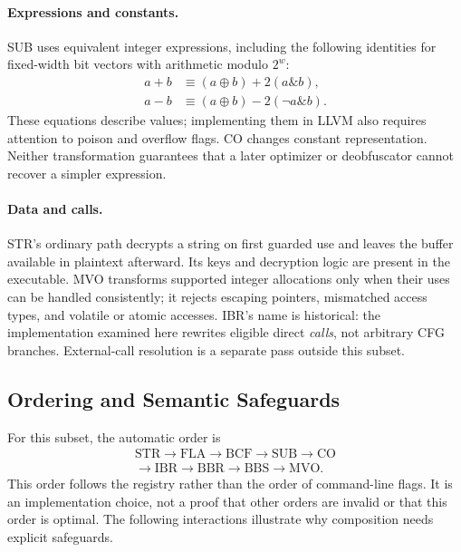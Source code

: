\documentclass[conference]{IEEEtran}
\begin{document}
\paragraph{Expressions and constants.}
SUB uses equivalent integer expressions, including the following
identities for fixed-width bit vectors with arithmetic modulo $2^w$:
\begin{align}
 a+b &\equiv (a\oplus b)+2(a\mathbin{\&}b),\\
 a-b &\equiv (a\oplus b)-2(\neg a\mathbin{\&}b).
\end{align}
These equations describe values; implementing them in LLVM also
requires attention to poison and overflow flags. CO changes constant
representation. Neither transformation guarantees that a later
optimizer or deobfuscator cannot recover a simpler expression.

\paragraph{Data and calls.}
STR's ordinary path decrypts a string on first guarded use and leaves
the buffer available in plaintext afterward. Its keys and decryption
logic are present in the executable. MVO transforms supported integer
allocations only when their uses can be handled consistently; it
rejects escaping pointers, mismatched access types, and volatile or
atomic accesses. IBR's name is historical: the implementation examined
here rewrites eligible direct \emph{calls}, not arbitrary CFG branches.
External-call resolution is a separate pass outside this subset.

\subsection{Ordering and Semantic Safeguards}

For this subset, the automatic order is
\[
\begin{gathered}
\mathrm{STR}\to\mathrm{FLA}\to\mathrm{BCF}\to\mathrm{SUB}\to\mathrm{CO}\\
\to\mathrm{IBR}\to\mathrm{BBR}\to\mathrm{BBS}\to\mathrm{MVO}.
\end{gathered}
\]
This order follows the registry rather than the order of command-line
flags. It is an implementation choice, not a proof that other orders
are invalid or that this order is optimal. The following interactions
illustrate why composition needs explicit safeguards.
\end{document}
